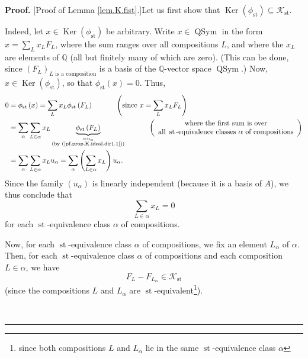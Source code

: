\documentclass[numbers=enddot,12pt,final,onecolumn,notitlepage]{scrartcl}%
\theoremstyle{definition}
\newenvironment{proof}[1][Proof]{\noindent\textbf{#1.} }{\ \rule{0.5em}{0.5em}}
\newenvironment{verlong}{}{}
\let\sumnonlimits\sum
\renewcommand{\sum}{\sumnonlimits\limits}
\begin{document}
\begin{verlong}
\begin{proof}
[Proof of Lemma \ref{lem.K.fist}.]Let us first show that $\operatorname*{Ker}%
\left(  \phi_{\operatorname*{st}}\right)  \subseteq\mathcal{K}%
_{\operatorname*{st}}$.

Indeed, let $x\in\operatorname*{Ker}\left(  \phi_{\operatorname*{st}}\right)
$ be arbitrary. Write $x\in\operatorname*{QSym}$ in the form $x=\sum_{L}%
x_{L}F_{L}$, where the sum ranges over all compositions $L$, and where the
$x_{L}$ are elements of $\mathbb{Q}$ (all but finitely many of which are
zero). (This can be done, since $\left(  F_{L}\right)  _{L\text{ is a
composition}}$ is a basis of the $\mathbb{Q}$-vector space
$\operatorname*{QSym}$.) Now, $x\in\operatorname*{Ker}\left(  \phi
_{\operatorname*{st}}\right)  $, so that $\phi_{\operatorname*{st}}\left(
x\right)  =0$. Thus,%
\begin{align*}
0  &  =\phi_{\operatorname*{st}}\left(  x\right)  =\sum_{L}x_{L}%
\phi_{\operatorname*{st}}\left(  F_{L}\right)  \ \ \ \ \ \ \ \ \ \ \left(
\text{since }x=\sum_{L}x_{L}F_{L}\right) \\
&  =\sum_{\alpha}\sum_{L\in\alpha}x_{L}\underbrace{\phi_{\operatorname*{st}%
}\left(  F_{L}\right)  }_{\substack{=u_{\alpha}\\\text{(by
(\ref{pf.prop.K.ideal.dir1.1}))}}}\ \ \ \ \ \ \ \ \ \ \left(
\begin{array}
[c]{c}%
\text{where the first sum is over}\\
\text{all }\operatorname*{st}\text{-equivalence classes }\alpha\text{ of
compositions}%
\end{array}
\right) \\
&  =\sum_{\alpha}\sum_{L\in\alpha}x_{L}u_{\alpha}=\sum_{\alpha}\left(
\sum_{L\in\alpha}x_{L}\right)  u_{\alpha}.
\end{align*}
Since the family $\left(  u_{\alpha}\right)  $ is linearly independent
(because it is a basis of $A$), we thus conclude that
\begin{equation}
\sum_{L\in\alpha}x_{L}=0 \label{pf.prop.K.ideal.dir1.2}%
\end{equation}
for each $\operatorname*{st}$-equivalence class $\alpha$ of compositions.

Now, for each $\operatorname*{st}$-equivalence class $\alpha$ of compositions,
we fix an element $L_{\alpha}$ of $\alpha$. Then, for each $\operatorname*{st}%
$-equivalence class $\alpha$ of compositions and each composition $L\in\alpha
$, we have
\begin{equation}
F_{L}-F_{L_{\alpha}}\in\mathcal{K}_{\operatorname*{st}}
\label{pf.prop.K.ideal.dir1.3}%
\end{equation}
(since the compositions $L$ and $L_{\alpha}$ are $\operatorname*{st}%
$-equivalent\footnote{since both compositions $L$ and $L_{\alpha}$ lie in the
same $\operatorname*{st}$-equivalence class $\alpha$}).


\end{proof}
\end{verlong}
\end{document}
